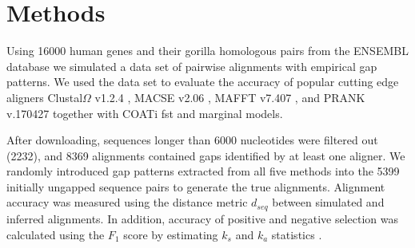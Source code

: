 \section{Methods}

Using 16000 human genes and their gorilla homologous pairs from the ENSEMBL
database \parencite{ensembl_hubbard_2002} we simulated a data set of pairwise
alignments with empirical gap patterns.
We used the data set to evaluate the accuracy of popular cutting edge aligners
Clustal$\Omega$ v1.2.4 \parencite{clustal_omega_sievers_2011},
MACSE v2.06 \parencite{ranwez_macse_2011}, MAFFT v7.407
\parencite{mafft_katoh_2002}, and PRANK v.170427 \parencite{prank_loytynoja_2014}
together with COATi fst and marginal models.

After downloading, sequences longer than 6000 nucleotides were filtered out
(2232), and 8369 alignments contained gaps identified by at least one
aligner.
We randomly introduced gap patterns extracted from all five methods into the
5399 initially ungapped sequence pairs to generate the true alignments.
Alignment accuracy was measured using the distance metric $d_{seq}$
\parencite{metrics_blackburne_whelan_2011} between simulated and inferred
alignments.
In addition, accuracy of positive and negative selection was calculated
using the $F_1$ score by estimating $k_s$ and $k_a$ statistics
\parencite{ka_ks_li_1993}.
